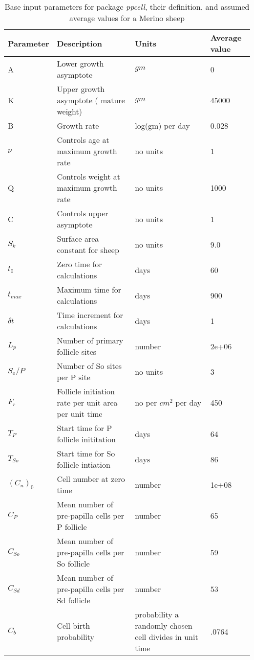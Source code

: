 %

\begin{table}[htp]
\centering
\caption{Base input parameters for package {\em ppcell}, their definition, and assumed average values for a Merino sheep} 
\label{tab:base}
\vspace{0.1in}
\begin{tabular}{|p{0.5in}|p{2.0in}|p{1.2in}|p{0.5in}|}  \hline
     Parameter & Description  & Units & Average value  \\ 
\hline 
  A    & Lower growth asymptote  & $gm$ & 0 \\
  K    & Upper growth asymptote ( mature weight)  & $gm$ & 45000 \\
  B    & Growth rate             & log(gm) per day & 0.028 \\ 
 $\nu$ & Controls age at maximum growth rate & no units  & 1\\
  Q    & Controls weight at maximum growth rate & no units  & 1000\\
  C    & Controls upper asymptote & no units  & 1\\
\hline
  $S_{k}$ & Surface area constant for sheep & no units  & 9.0 \\
  $t_{0}$ & Zero time for calculations & days & 60  \\
  $t_{max}$ & Maximum time for calculations & days & 900 \\
  $\delta t$ & Time increment for calculations & days & 1  \\
  $L_{p}$  &  Number of primary follicle sites & number & 2e+06 \\
  $S_{o}/P$ & Number of So sites per P site & no units  & 3 \\
  $F_{r}$ & Follicle initiation rate per unit area per unit time & no per $cm^{2}$ per day  & 450\\
  $T_{P}$ & Start time for P follicle inititation & days & 64 \\
  $T_{So}$ & Start time for So follicle intiation & days & 86 \\
  $(C_{n})_{0}$ &  Cell number at zero time & number & 1e+08 \\
  $C_{P}$ & Mean number of pre-papilla cells per P follicle & number  & 65\\
  $C_{So}$ & Mean number of pre-papilla cells per So follicle & number & 59 \\
  $C_{Sd}$ & Mean number of pre-papilla cells per Sd follicle & number & 53 \\
  $C_{b}$  & Cell birth probability & probability a randomly chosen cell divides in unit time  & .0764 \\
\hline

\end{tabular}
\end{table}

%
